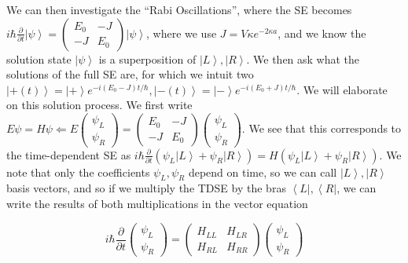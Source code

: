 \documentclass{report}
\begin{document}
We can then investigate the ``Rabi Oscillations'', where the SE becomes $i\hbar \frac{\partial}{\partial t}\left|\psi\right> = \begin{pmatrix}E_0&-J\\-J&E_0\end{pmatrix}\left|\psi\right>$, where we use $J = V\kappa e^{-2\kappa a}$, and we know the solution state $\left|\psi\right>$ is a superposition of $\left|L\right>,\left|R\right>$. We then ask what the solutions of the full SE are, for which we intuit two $\left|+(t)\right> = \left|+\right>e^{-i(E_0-J)t/\hbar}, \left|-(t)\right> = \left|-\right>e^{-i(E_0+J)t/\hbar}$. We will elaborate on this solution process. We first write $E\psi = H\psi \Leftarrow E\begin{pmatrix}\psi_L\\\psi_R\end{pmatrix} = \begin{pmatrix}E_0&-J\\-J&E_0\end{pmatrix}\begin{pmatrix}\psi_L\\\psi_R\end{pmatrix}$. We see that this corresponds to the time-dependent SE as $i\hbar \frac{\partial}{\partial t}\left(\psi_L\left|L\right> + \psi_R\left|R\right>\right) = H\left(\psi_L\left|L\right> + \psi_R\left|R\right>\right)$. We note that only the coefficients $\psi_L, \psi_R$ depend on time, so we can call $\left|L\right>,\left|R\right>$ basis vectors, and so if we multiply the TDSE by the bras $\left<L\right|,\left<R\right|$, we can write the results of both multiplications in the vector equation

$$i\hbar \frac{\partial}{\partial t}\begin{pmatrix}\psi_L\\\psi_R\end{pmatrix} = \begin{pmatrix}H_{LL}&H_{LR}\\H_{RL} & H_{RR}\end{pmatrix}\begin{pmatrix}\psi_L\\\psi_R\end{pmatrix}$$
\end{document}
